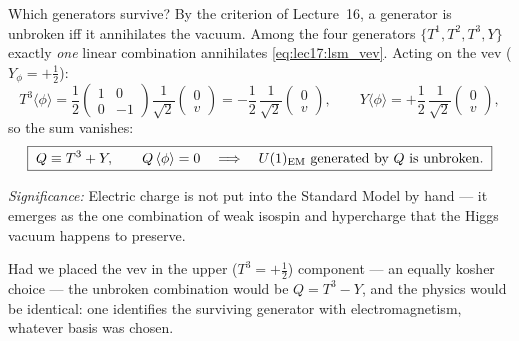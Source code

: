 Which generators survive? By the criterion of Lecture~16, a generator is unbroken iff it annihilates the vacuum. Among the four generators $\{T^1,T^2,T^3,Y\}$ exactly \emph{one} linear combination annihilates \eqref{eq:lec17:lsm_vev}. Acting on the vev ($Y_\phi=+\tfrac12$):
\begin{equation}
  T^3\langle\phi\rangle
  =\frac{1}{2}\begin{pmatrix}1&0\\0&-1\end{pmatrix}\frac{1}{\sqrt2}\begin{pmatrix}0\\v\end{pmatrix}
  =-\frac{1}{2}\,\frac{1}{\sqrt2}\begin{pmatrix}0\\v\end{pmatrix},
  \qquad
  Y\langle\phi\rangle=+\frac12\,\frac{1}{\sqrt2}\begin{pmatrix}0\\v\end{pmatrix} ,
  \label{eq:lec17:generators_on_vev}
\end{equation}
so the sum vanishes:
\begin{equation}
  \boxed{\;Q\equiv T^3+Y ,
  \qquad
  Q\,\langle\phi\rangle=0
  \quad\Longrightarrow\quad
  U(1)_{\rm EM}\ \text{generated by }Q\ \text{is unbroken.}\;}
  \label{eq:lec17:electric_charge}
\end{equation}

\textit{Significance:} Electric charge is not put into the Standard Model by hand --- it emerges as the one combination of weak isospin and hypercharge that the Higgs vacuum happens to preserve.

Had we placed the vev in the upper ($T^3=+\tfrac12$) component --- an equally kosher choice --- the unbroken combination would be $Q=T^3-Y$, and the physics would be identical: one identifies the surviving generator with electromagnetism, whatever basis was chosen.


